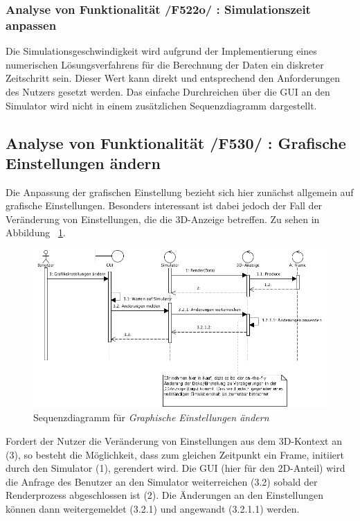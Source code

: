 \subsubsection{Analyse von Funktionalität /F522o/ :  Simulationszeit anpassen}
Die Simulationsgeschwindigkeit wird aufgrund der Implementierung eines numerischen Lösungsverfahrens für die Berechnung der Daten ein diskreter Zeitschritt sein. Dieser Wert kann direkt und entsprechend
den Anforderungen des Nutzers gesetzt werden. Das einfache Durchreichen über die GUI an den Simulator wird nicht in einem zusätzlichen Sequenzdiagramm dargestellt.
\subsection{Analyse von Funktionalität /F530/ :  Grafische Einstellungen ändern}
Die Anpassung der grafischen Einstellung bezieht sich hier zunächst allgemein auf grafische Einstellungen. Besonders interessant ist dabei jedoch der Fall der Veränderung von Einstellungen, die 
die 3D-Anzeige betreffen. Zu sehen in Abbildung ~\ref{fig:change_graphic_config}.

\begin{figure}[h!]
\includegraphics[width=\linewidth]{bilder/change_graphic_config}
\caption{Sequenzdiagramm für \textit{Graphische Einstellungen ändern}}
\label{fig:change_graphic_config}
\end{figure}
Fordert der Nutzer die Veränderung von Einstellungen aus dem 3D-Kontext an (3), so besteht die Möglichkeit, dass zum gleichen Zeitpunkt ein Frame, initiiert durch den Simulator (1), gerendert wird. 
Die GUI (hier für den 2D-Anteil) wird die Anfrage des Benutzer an den Simulator weiterreichen (3.2) sobald der Renderprozess abgeschlossen ist (2). Die Änderungen an den Einstellungen können dann weitergemeldet (3.2.1) und angewandt (3.2.1.1) werden.

